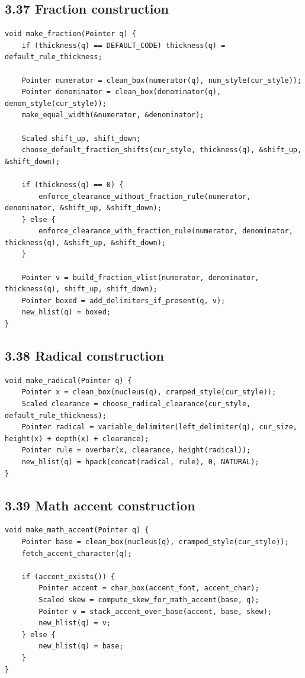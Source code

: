 \documentclass[11pt]{article}
\begin{document}
\subsection{3.37 Fraction construction}\label{fraction-construction}

\begin{verbatim}
void make_fraction(Pointer q) {
    if (thickness(q) == DEFAULT_CODE) thickness(q) = default_rule_thickness;

    Pointer numerator = clean_box(numerator(q), num_style(cur_style));
    Pointer denominator = clean_box(denominator(q), denom_style(cur_style));
    make_equal_width(&numerator, &denominator);

    Scaled shift_up, shift_down;
    choose_default_fraction_shifts(cur_style, thickness(q), &shift_up, &shift_down);

    if (thickness(q) == 0) {
        enforce_clearance_without_fraction_rule(numerator, denominator, &shift_up, &shift_down);
    } else {
        enforce_clearance_with_fraction_rule(numerator, denominator, thickness(q), &shift_up, &shift_down);
    }

    Pointer v = build_fraction_vlist(numerator, denominator, thickness(q), shift_up, shift_down);
    Pointer boxed = add_delimiters_if_present(q, v);
    new_hlist(q) = boxed;
}
\end{verbatim}

\subsection{3.38 Radical construction}\label{radical-construction}

\begin{verbatim}
void make_radical(Pointer q) {
    Pointer x = clean_box(nucleus(q), cramped_style(cur_style));
    Scaled clearance = choose_radical_clearance(cur_style, default_rule_thickness);
    Pointer radical = variable_delimiter(left_delimiter(q), cur_size, height(x) + depth(x) + clearance);
    Pointer rule = overbar(x, clearance, height(radical));
    new_hlist(q) = hpack(concat(radical, rule), 0, NATURAL);
}
\end{verbatim}

\subsection{3.39 Math accent
construction}\label{math-accent-construction}

\begin{verbatim}
void make_math_accent(Pointer q) {
    Pointer base = clean_box(nucleus(q), cramped_style(cur_style));
    fetch_accent_character(q);

    if (accent_exists()) {
        Pointer accent = char_box(accent_font, accent_char);
        Scaled skew = compute_skew_for_math_accent(base, q);
        Pointer v = stack_accent_over_base(accent, base, skew);
        new_hlist(q) = v;
    } else {
        new_hlist(q) = base;
    }
}
\end{verbatim}
\end{document}
